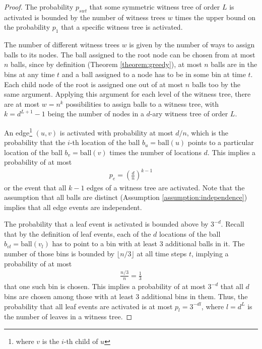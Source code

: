 \documentclass[a4paper,12pt]{article}
\begin{document}
\begin{proof}
The probability $p_{swt}$ that some symmetric witness tree of order $L$ is activated is bounded by the number of witness trees $w$ times the upper bound on the probability $p_1$ that a specific witness tree is activated.

The number of different witness trees $w$ is given by the number of ways to assign balls to its nodes. The ball assigned to the root node can be chosen from at most $n$ balls, since by definition (Theorem \ref{theorem:greedy}), at most $n$ balls are in the bins at any time $t$ and a ball assigned to a node has to be in some bin at time $t$. Each child node of the root is assigned one out of at most $n$ balls too by the same argument. Applying this argument for each level of the witness tree, there are at most $w = n^k$ possibilities to assign balls to a witness tree, with $k = d^{L+1}-1$ being the number of nodes in a $d$-ary witness tree of order $L$.
 
An edge\footnote{where $v$ is the $i$-th child of $u$} $(u, v)$ is activated with probability at most $d/n$, which is the probability that the $i$-th location of the ball $b_u = \mathrm{ball}(u)$ points to a particular location of the ball $b_v = \mathrm{ball}(v)$ times the number of locations $d$. This implies a probability of at most
\begin{align*}
p_e = \left(\frac{d}{n}\right)^{k-1}
\end{align*} 
or the event that all $k-1$ edges of a witness tree are activated. Note that  the assumption that all balls are distinct (Assumption \ref{assumption:independence}) implies that all edge events are independent.

The probability that a leaf event is activated is bounded above by $3^{-d}$. Recall that by the definition of leaf events, each of the $d$ locations of the ball $b_{vl} = \mathrm{ball}(v_l)$ has to point to a bin with at least 3 additional balls in it. The number of those bins is bounded by $\lfloor n/3 \rfloor$ at all time steps $t$, implying a probability of at most 
\begin{align*}
\frac{n/3}{n} = \frac{1}{3}
\end{align*}
that one such bin is chosen. This implies a probability of at most $3^{-d}$ that all $d$ bins are chosen among those with at least 3 additional bins in them. Thus, the probability that all leaf events are activated is at most $p_l = 3^{-d l}$, where $l = d^{L}$ is the number of leaves in a witness tree.


\end{proof}
\end{document}
